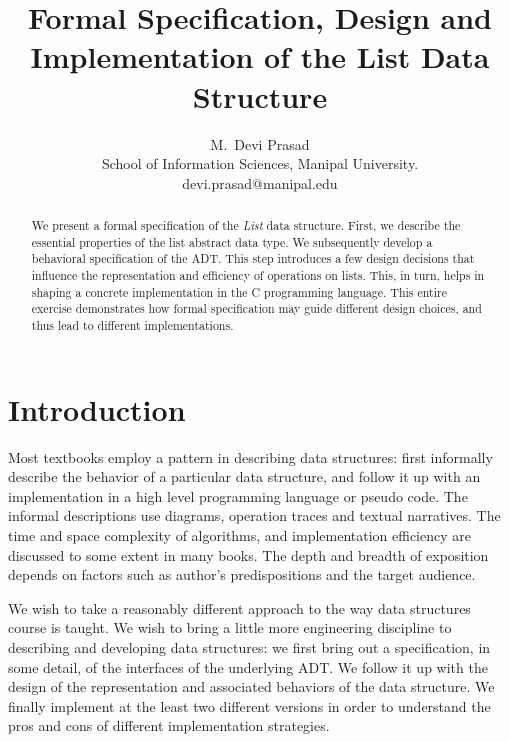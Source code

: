 \documentclass[10pt]{article}
\begin{document}
\title{Formal Specification, Design and Implementation of the List Data Structure}
\author{
  M.\, Devi Prasad\\
  School of Information Sciences, Manipal University.\vspace*{6pt}\\
  devi.prasad@manipal.edu
 }
\date{}
\maketitle

\begin{abstract}
We present a formal specification of the \emph{List} data structure. First, we describe the essential properties of the list abstract data type. We subsequently develop a behavioral specification of the ADT. This step introduces a few design decisions that influence the representation and efficiency of operations on lists. This, in turn, helps in shaping a concrete implementation in the C programming language. This entire exercise demonstrates how formal specification may guide different design choices, and thus lead to different implementations.
\end{abstract}

\section{Introduction}
Most textbooks employ a pattern in describing data structures: first informally describe the behavior of a particular data structure, and follow it up with an implementation in a high level programming language or pseudo code. The informal descriptions use diagrams, operation traces and textual narratives. The time and space complexity of algorithms, and implementation efficiency are discussed to some extent in many books. The depth and breadth of exposition depends on factors such as author's predispositions and the target audience.

We wish to take a reasonably different approach to the way data structures course is taught. We wish to bring a little more engineering discipline to describing and developing data structures: we first bring out a specification, in some detail, of the interfaces of the underlying ADT. We follow it up with the design of the representation and associated behaviors of the data structure. We finally implement at the least two different versions in order to understand the pros and cons of different implementation strategies.
\end{document}
